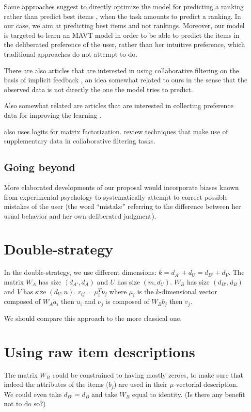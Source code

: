 \documentclass[french, english]{da2pl2018}
\begin{document}
Some approaches suggest to directly optimize the model for predicting a ranking rather than predict best items \citep{rendle_bpr:_2009}, when the task amounts to predict a ranking. In our case, we aim at predicting best items and not rankings. Moreover, our model is targeted to learn an MAVT model in order to be able to predict the items in the deliberated preference of the user, rather than her intuitive preference, which traditional approaches do not attempt to do.

There are also articles that are interested in using collaborative filtering on the basis of implicit feedback \citep{rendle_bpr:_2009, hu_collaborative_2008}, an idea somewhat related to ours in the sense that the observed data is not directly the one the model tries to predict.

Also somewhat related are articles that are interested in collecting preference data for improving the learning \citep{sepliarskaia_preference_2018}.

\citet{johnson_logistic_2014} also uses logits for matrix factorization. \citet{chen_attribute-aware_2018} review techniques that make use of supplementary data in collaborative filtering tasks.

\subsection{Going beyond}
More elaborated developments of our proposal would incorporate biases known from experimental psychology to systematically attempt to correct possible mistakes of the user (the word “mistake” referring to the difference between her usual behavior and her own deliberated judgment).



\appendix
\section{Double-strategy}
In the double-strategy, we use different dimensions: $k = d_{A'} + d_U = d_{B'} + d_V$.
The matrix $W_A$ has size $(d_{A'}, d_A)$ and $U$ has size $(m, d_U)$. $W_B$ has size $(d_{B'}, d_B)$ and $V$ has size $(d_V, n)$. $r_{ij} = \mu_i^T \nu_j$ where $\mu_i$ is the $k$-dimensional vector composed of $W_A a_i$ then $u_i$ and $\nu_j$ is composed of $W_B b_j$ then $v_j$.

We should compare this approach to the more classical one.

\section{Using raw item descriptions}
The matrix $W_B$ could be constrained to having mostly zeroes, to make sure that indeed the attributes of the items ($b_j$) are used in their $\mu$-vectorial description. We could even take $d_{B'} = d_B$ and take $W_B$ equal to identity. (Is there any benefit not to do so?)
\end{document}
